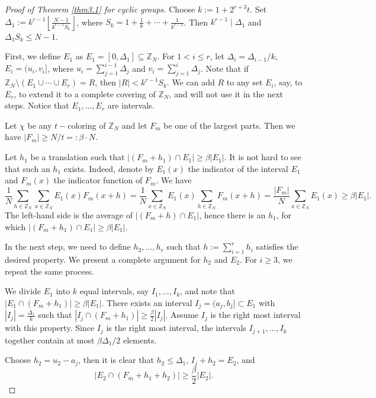 \documentclass[11pt]{article}
\theoremstyle{definition}
\begin{document}
\begin{proof}[Proof of Theorem \ref{thm3.1} for cyclic groups]
 Choose $k := 1 + 2^{r+3} t$. Set $\Delta_1 :=k^{r-1} \left\lfloor \frac{N-1}{k^{r-1}S_k} \right\rfloor$, where $S_k = 1 + \frac{1}{k} + \cdots + \frac{1}{k^{r-1}}$. Then $k^{r-1} \mid \Delta_1$ and $\Delta_1 S_k \leq N - 1$.
      
First, we define $E_1$ as $E_1=[0,\Delta_1]\subseteq \mathbb{Z}_N$. For $1<i\leq r$, let $\Delta_i=\Delta_{i-1}/k$, $E_i=(u_i,v_i]$, where $u_i=\sum_{j=1}^{i-1}\Delta_j$ and $v_i=\sum_{j=1}^{i}\Delta_j$. Note that if $\mathbb{Z}_N\setminus (E_1\cup \cdots \cup E_r)=R$, then $|R|<k^{r-1}S_k$. We can add $R$ to any set $E_i$, say, to $E_r$, to extend it to a complete covering of $\mathbb{Z}_N$, and will not use it in the next steps. Notice that $E_1, \ldots, E_r$ are intervals.

Let $\chi$ be any $t-$coloring of $\mathbb{Z}_N$ and let $F_m$ be one of the largest parts. Then we have $|F_m|\geq N/t=:\beta \cdot N$. 

Let $h_1$ be a translation such that $|(F_m+h_1)\cap E_1|\geq  \beta|E_1|$. It is not hard to see that such an $h_1$ exists. Indeed, denote by $E_1(x)$ the indicator of the interval $E_1$ and $F_m(x)$ the indicator function of $F_m$. We have
\[
\frac{1}{N}\sum_{h\in \mathbb{Z}_N}\sum_{x\in \mathbb{Z}_N}E_1(x)F_m(x+h)=\frac{1}{N}\sum_{x\in \mathbb{Z}_N}E_1(x)\sum_{h\in \mathbb{Z}_N}F_m(x+h)= \frac{|F_m|}{N}\sum_{x\in \mathbb{Z}_N}E_1(x)\ge \beta|E_1|.
\]
The left-hand side is the average of $|(F_m+h)\cap E_1|$, hence there is an $h_1$, for which $|(F_m+h_1)\cap E_1|\geq  \beta|E_1|$.


In the next step, we need to define $h_2, \ldots, h_r$ such that $h:=\sum_{i=1}^rh_i$ satisfies the desired property. We present a complete argument for $h_2$ and $E_2$. For $i\ge 3$, we repeat the same process.

We divide $E_1$ into $k$ equal intervals, say $I_1, \ldots, I_k$, and note that $|E_1\cap (F_m+h_1)|\ge \beta |E_1|$. There exists an interval $I_j=(a_j, b_j]\subset E_1$ with $|I_j|=\frac{\Delta_1}{k}$ such that $|I_j\cap (F_m+h_1)|\ge \frac{\beta}{2}|I_j|$. Assume $I_j$ is the right most interval with this property. Since $I_j$ is the right most interval, the intervals $I_{j+1}, \ldots, I_k$ together contain at most $\beta \Delta_1/2$ elements. 

Choose $h_2=u_2-a_j$, then it is clear that $h_2\le \Delta_1$, $I_j+h_2=E_2$, 
and 
\[|E_2\cap (F_m+h_1+h_2)|\ge \frac{\beta}{2}|E_2|.\]


\end{proof}
\end{document}

